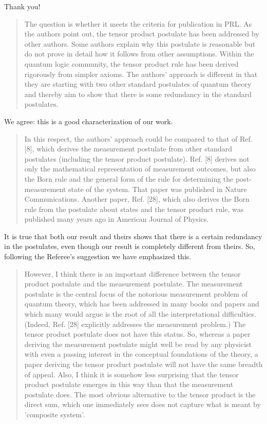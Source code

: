 \documentclass[11pt]{article}
\begin{document}
Thank you!

\begin{quote}The question is whether it meets the criteria for
publication in PRL.  As the authors point out, the tensor product
postulate has been addressed by other authors. Some authors explain
why this postulate is reasonable but do not prove in detail how it
follows from other assumptions. Within the quantum logic community,
the tensor product rule has been derived rigorously from simpler
axioms. The authors' approach is different in that they are starting
with two other standard postulates of quantum theory and thereby aim
to show that there is some redundancy in the standard postulates.
\end{quote}
We agree: this is a good characterization of our work.

\begin{quote}In this respect, the authors' approach could be compared
to that of Ref. [8], which derives the measurement postulate from
other standard postulates (including the tensor product
postulate). Ref. [8] derives not only the mathematical representation
of measurement outcomes, but also the Born rule and the general form
of the rule for determining the post-measurement state of the
system. That paper was published in Nature Communications. Another
paper, Ref. [28], which also derives the Born rule from the postulate
about states and the tensor product rule, was published many years ago
in American Journal of Physics.
\end{quote}

It is true that both our result and theirs shows that there is a certain redundancy in the postulates, even though our result is completely different from theirs. So, following the Referee's suggestion we have emphasized this.

\begin{quote}However, I think there is an important difference between
the tensor product postulate and the measurement postulate. The
measurement postulate is the central focus of the notorious
measurement problem of quantum theory, which has been addressed in
many books and papers and which many would argue is the root of all
the interpretational difficulties. (Indeed, Ref. [28] explicitly
addresses the measurement problem.) The tensor product postulate does
not have this status. So, whereas a paper deriving the measurement
postulate might well be read by any physicist with even a passing
interest in the conceptual foundations of the theory, a paper deriving
the tensor product postulate will not have the same breadth of
appeal. Also, I think it is somehow less surprising that the tensor
product postulate emerges in this way than that the measurement
postulate does. The most obvious alternative to the tensor product is
the direct sum, which one immediately sees does not capture what is
meant by 'composite system'.\end{quote}
\end{document}
